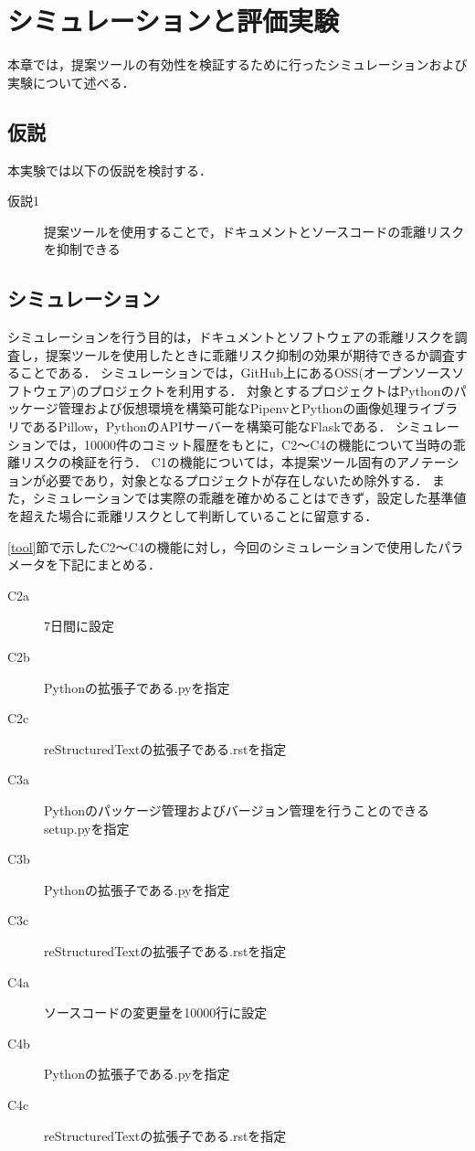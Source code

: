 \chapter{シミュレーションと評価実験}
本章では，提案ツールの有効性を検証するために行ったシミュレーションおよび実験について述べる．

\section{仮説}
本実験では以下の仮説を検討する．

\begin{description}
    \item[仮説1] 提案ツールを使用することで，ドキュメントとソースコードの乖離リスクを抑制できる
\end{description}

\section{シミュレーション}
\label{sim}
シミュレーションを行う目的は，ドキュメントとソフトウェアの乖離リスクを調査し，提案ツールを使用したときに乖離リスク抑制の効果が期待できるか調査することである．
シミュレーションでは，GitHub上にあるOSS(オープンソースソフトウェア)のプロジェクトを利用する．
対象とするプロジェクトはPythonのパッケージ管理および仮想環境を構築可能なPipenv\cite{pipenv}とPythonの画像処理ライブラリであるPillow\cite{pillow}，PythonのAPIサーバーを構築可能なFlask\cite{flask}である．
シミュレーションでは，10000件のコミット履歴をもとに，C2〜C4の機能について当時の乖離リスクの検証を行う．
C1の機能については，本提案ツール固有のアノテーションが必要であり，対象となるプロジェクトが存在しないため除外する．
また，シミュレーションでは実際の乖離を確かめることはできず，設定した基準値を超えた場合に乖離リスクとして判断していることに留意する．

\ref{tool}節で示したC2〜C4の機能に対し，今回のシミュレーションで使用したパラメータを下記にまとめる．
\begin{description}
    \item[C2a] 7日間に設定
    \item[C2b] Pythonの拡張子である.pyを指定
    \item[C2c] reStructuredTextの拡張子である.rstを指定 
    \item[C3a] Pythonのパッケージ管理およびバージョン管理を行うことのできるsetup.pyを指定
    \item[C3b] Pythonの拡張子である.pyを指定
    \item[C3c] reStructuredTextの拡張子である.rstを指定
    \item[C4a] ソースコードの変更量を10000行に設定
    \item[C4b] Pythonの拡張子である.pyを指定
    \item[C4c] reStructuredTextの拡張子である.rstを指定
\end{description}

